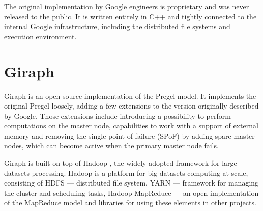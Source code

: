The original implementation by Google engineers is proprietary and was never released to the public. It is written entirely in C++ and tightly connected to the internal Google infrastructure, including the distributed file systems and execution environment.

\section{Giraph}

Giraph\cite{giraph} is an open-source implementation of the Pregel model. It implements the original Pregel loosely, adding a few extensions to the version originally described by Google. Those extensions include introducing a possibility to perform computations on the master node, capabilities to work with a support of external memory and removing the single-point-of-failure (SPoF) by adding spare master nodes, which can become active when the primary master node fails.

Giraph is built on top of Hadoop \cite{hadoop}, the widely-adopted framework for large datasets processing. Hadoop is a platform for big datasets computing at scale, consisting of HDFS --- distributed file system, YARN --- framework for managing the cluster and scheduling tasks, Hadoop MapReduce --- an open implementation of the MapReduce model and libraries for using these elements in other projects.

